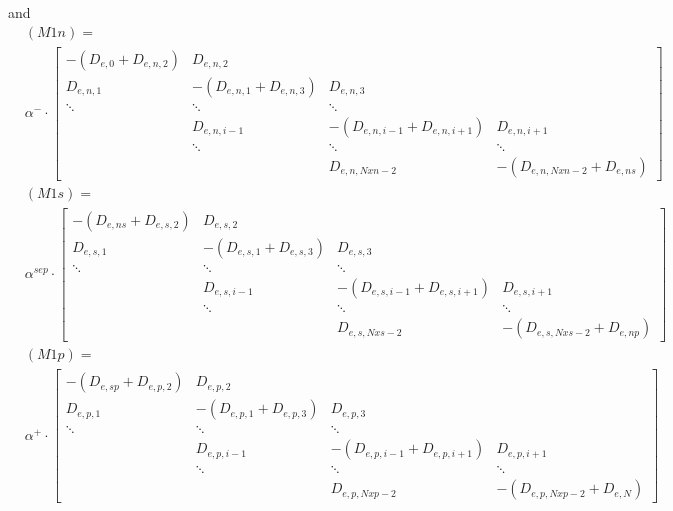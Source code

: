 \documentclass[12pt]{article}
\begin{document}
and
\begin{align}
&(M1n) =  \nonumber \\
&\alpha^{-} \cdot \left[
\begin{array}{cccc}
  -(D_{e,0} + D_{e,n,2}) & D_{e,n,2}  &  & \\
  D_{e,n,1} & -(D_{e,n,1}+D_{e,n,3})  & D_{e,n,3} & \\
  \ddots & \ddots  & \ddots & \\
  & D_{e,n,i-1} & -(D_{e,n,i-1} + D_{e,n,i+1}) & D_{e,n,i+1} \\
  & \ddots & \ddots  & \ddots \\
  &  & D_{e,n,Nxn-2} & -(D_{e,n,Nxn-2} + D_{e,ns})
\end{array}
\right]
\end{align}
\begin{align}
&(M1s) =  \nonumber \\
&\alpha^{sep} \cdot \left[
\begin{array}{cccc}
  -(D_{e,ns} + D_{e,s,2}) & D_{e,s,2}  &  & \\
  D_{e,s,1} & -(D_{e,s,1}+D_{e,s,3})  & D_{e,s,3} & \\
  \ddots & \ddots  & \ddots & \\
  & D_{e,s,i-1} & -(D_{e,s,i-1} + D_{e,s,i+1}) & D_{e,s,i+1} \\
  & \ddots & \ddots  & \ddots \\
  &  & D_{e,s,Nxs-2} & -(D_{e,s,Nxs-2} + D_{e,np})
\end{array}
\right]
\end{align}
\begin{align}
&(M1p) =  \nonumber \\
&\alpha^{+} \cdot \left[
\begin{array}{cccc}
  -(D_{e,sp} + D_{e,p,2}) & D_{e,p,2}  &  & \\
  D_{e,p,1} & -(D_{e,p,1}+D_{e,p,3})  & D_{e,p,3} & \\
  \ddots & \ddots  & \ddots & \\
  & D_{e,p,i-1} & -(D_{e,p,i-1} + D_{e,p,i+1}) & D_{e,p,i+1} \\
  & \ddots & \ddots  & \ddots \\
  &  & D_{e,p,Nxp-2} & -(D_{e,p,Nxp-2} + D_{e,N})
\end{array}
\right]
\end{align}
\end{document}
